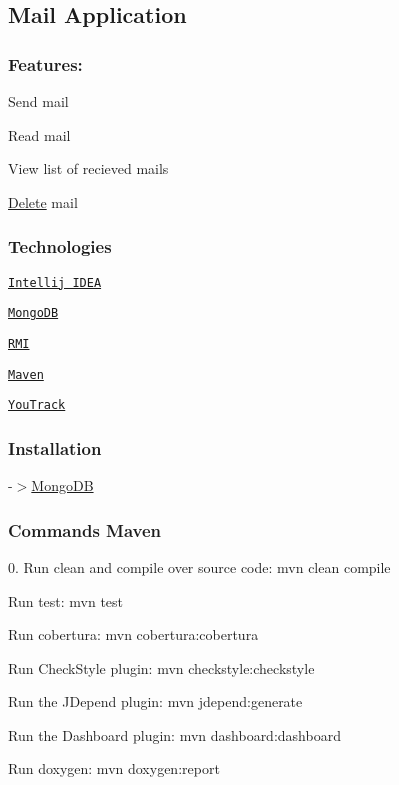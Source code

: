 \subsection*{Mail Application}

\subsubsection*{Features\+:}


\begin{DoxyItemize}
\item Send mail
\item Read mail
\item View list of recieved mails
\item \hyperlink{class_delete}{Delete} mail
\end{DoxyItemize}

\subsubsection*{Technologies}


\begin{DoxyItemize}
\item \href{https://www.jetbrains.com/idea/}{\tt Intellij I\+D\+EA}
\item \href{https://www.mongodb.com/}{\tt Mongo\+DB}
\item \href{http://docs.oracle.com/javase/7/docs/technotes/guides/rmi/hello/hello-world.html}{\tt R\+MI}
\item \href{https://maven.apache.org/}{\tt Maven}
\item \href{https://www.jetbrains.com/youtrack/}{\tt You\+Track}
\end{DoxyItemize}

\subsubsection*{Installation}

-\/$>$\hyperlink{class_mongo_d_b}{Mongo\+DB}

\subsubsection*{Commands Maven}

0. Run clean and compile over source code\+: mvn clean compile
\begin{DoxyEnumerate}
\item Run test\+: mvn test
\item Run cobertura\+: mvn cobertura\+:cobertura
\item Run Check\+Style plugin\+: mvn checkstyle\+:checkstyle
\item Run the J\+Depend plugin\+: mvn jdepend\+:generate
\item Run the Dashboard plugin\+: mvn dashboard\+:dashboard
\item Run doxygen\+: mvn doxygen\+:report 
\end{DoxyEnumerate}